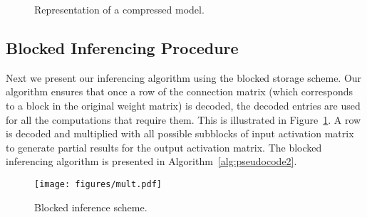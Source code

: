 \begin{figure}[!tbp]
  \centering
 \hspace{10mm}
  \caption{Representation of a compressed model.}
\end{figure}



\subsection{Blocked Inferencing Procedure}

Next we present our inferencing algorithm using the blocked storage scheme. 
Our algorithm ensures that once a  row of the connection matrix (which corresponds to a block
in the original weight matrix) is decoded,
the decoded entries are used for all the computations that require them.
This is illustrated in Figure~\ref{fig:block_mult}. A row is decoded and multiplied with all possible subblocks of 
input activation matrix to generate partial results for the output activation matrix. 
The blocked inferencing algorithm is presented in Algorithm~\ref{alg:pseudocode2}.


\begin{figure}[b]
\centering
\texttt{[image: figures/mult.pdf]}
\caption{Blocked inference scheme.}
\label{fig:block_mult}
\end{figure}





